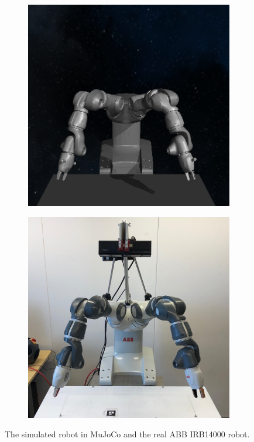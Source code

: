 \documentclass{kththesis}
\begin{document}
\begin{figure}%
    \centering
    \begin{subfigure}{0.4\textwidth}
    \includegraphics[width=1\textwidth]{img/yumi/yumi-pose-sim}
    \end{subfigure}
    \begin{subfigure}{0.4\textwidth}
    \includegraphics[width=1\textwidth]{img/yumi/yumi-pose-real}
    \end{subfigure}
    \caption{The simulated robot in MuJoCo and the real ABB IRB14000 robot.}
    \label{fig:robots}%
\end{figure}
\end{document}
